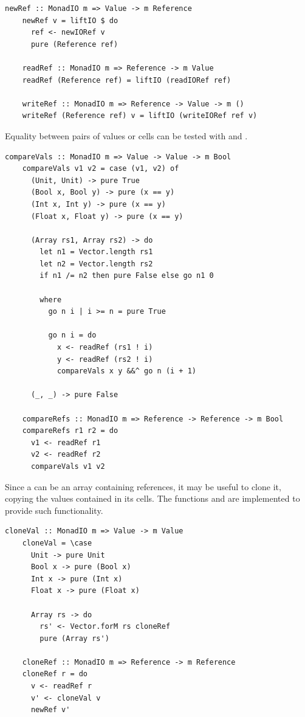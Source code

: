 \documentclass[UdineBachThesis,american,11pt]{PhdThesis}
\begin{document}
  \begin{lstlisting}[gobble=4,basicstyle=\ttfamily\small]
    newRef :: MonadIO m => Value -> m Reference
    newRef v = liftIO $ do
      ref <- newIORef v
      pure (Reference ref)

    readRef :: MonadIO m => Reference -> m Value
    readRef (Reference ref) = liftIO (readIORef ref)

    writeRef :: MonadIO m => Reference -> Value -> m ()
    writeRef (Reference ref) v = liftIO (writeIORef ref v)
  \end{lstlisting}

  Equality between pairs of values or cells can be tested with
  \lstinline@compareVals@ and \lstinline@compareRefs@.

  \begin{lstlisting}[gobble=4,basicstyle=\ttfamily\small]
    compareVals :: MonadIO m => Value -> Value -> m Bool
    compareVals v1 v2 = case (v1, v2) of
      (Unit, Unit) -> pure True
      (Bool x, Bool y) -> pure (x == y)
      (Int x, Int y) -> pure (x == y)
      (Float x, Float y) -> pure (x == y)

      (Array rs1, Array rs2) -> do
        let n1 = Vector.length rs1
        let n2 = Vector.length rs2
        if n1 /= n2 then pure False else go n1 0

        where
          go n i | i >= n = pure True

          go n i = do
            x <- readRef (rs1 ! i)
            y <- readRef (rs2 ! i)
            compareVals x y &&^ go n (i + 1)

      (_, _) -> pure False

    compareRefs :: MonadIO m => Reference -> Reference -> m Bool
    compareRefs r1 r2 = do
      v1 <- readRef r1
      v2 <- readRef r2
      compareVals v1 v2
  \end{lstlisting}

  Since a \lstinline@Value@ can be an array containing references, it may be
  useful to clone it, copying the values contained in its cells. The functions
  \lstinline@cloneVal@ and \lstinline@cloneRef@ are implemented to provide such
  functionality.

  \begin{lstlisting}[gobble=4,basicstyle=\ttfamily\small]
    cloneVal :: MonadIO m => Value -> m Value
    cloneVal = \case
      Unit -> pure Unit
      Bool x -> pure (Bool x)
      Int x -> pure (Int x)
      Float x -> pure (Float x)

      Array rs -> do
        rs' <- Vector.forM rs cloneRef
        pure (Array rs')

    cloneRef :: MonadIO m => Reference -> m Reference
    cloneRef r = do
      v <- readRef r
      v' <- cloneVal v
      newRef v'
  \end{lstlisting}
\end{document}
